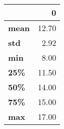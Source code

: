 \begin{tabular}{lr}
\toprule
{} &      0 \\
\midrule
\textbf{mean} &  12.70 \\
\textbf{std } &   2.92 \\
\textbf{min } &   8.00 \\
\textbf{25\% } &  11.50 \\
\textbf{50\% } &  14.00 \\
\textbf{75\% } &  15.00 \\
\textbf{max } &  17.00 \\
\bottomrule
\end{tabular}
